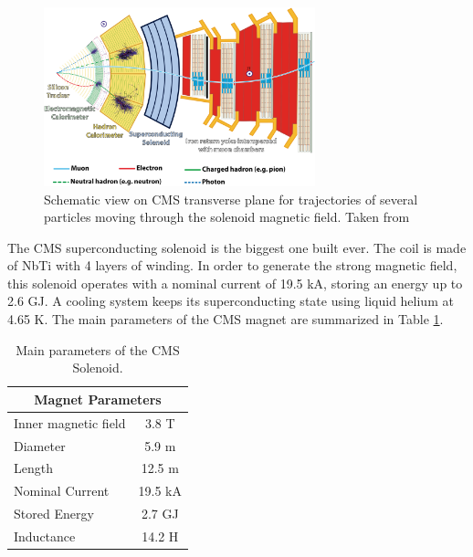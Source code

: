 \begin{figure}[ht]
    \begin{center}
      \includegraphics[width=0.7\textwidth]{figuras/Chapter2/CMStrajectories.png}
      \caption{Schematic view on CMS transverse plane for trajectories of several particles moving through the solenoid magnetic field. Taken from \cite{Barney:2120661}
      } \label{figchp2:CMStrajectories}
    \end{center}
 \end{figure}

The CMS superconducting solenoid is the biggest one built ever. The coil is made of NbTi with 4 layers of winding. In order to 
generate the strong magnetic field, this solenoid operates
with a nominal current of 19.5 kA, storing an energy up to 2.6 GJ. A cooling system
keeps its superconducting state using liquid helium at 4.65 K. The 
main parameters of the CMS magnet are summarized in Table \ref{tablechp2:Solenoid}.

\begin{table}[h]
\centering
\begin{tabular}{|l|c|}\hline \hline
\multicolumn{2}{|c|}{Magnet Parameters}  \\ \hline \hline
Inner magnetic field   &  3.8 T  \\ \hline
Diameter               &  5.9 m  \\ \hline
Length                 &  12.5 m  \\ \hline
Nominal Current        &  19.5 kA \\ \hline
Stored Energy          &  2.7 GJ  \\ \hline
Inductance             &  14.2 H  \\ \hline \hline
\end{tabular}
\caption{Main parameters of the CMS Solenoid.} \label{tablechp2:Solenoid}
\end{table}



